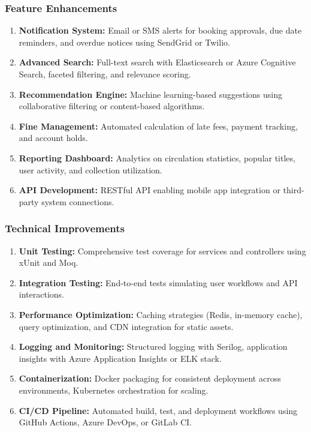 \documentclass[12pt,a4paper]{article}
\begin{document}
\subsubsection{Feature Enhancements}

\begin{enumerate}[leftmargin=*]
    \item \textbf{Notification System:} Email or SMS alerts for booking approvals, due date reminders, and overdue notices using SendGrid or Twilio.
    
    \item \textbf{Advanced Search:} Full-text search with Elasticsearch or Azure Cognitive Search, faceted filtering, and relevance scoring.
    
    \item \textbf{Recommendation Engine:} Machine learning-based suggestions using collaborative filtering or content-based algorithms.
    
    \item \textbf{Fine Management:} Automated calculation of late fees, payment tracking, and account holds.
    
    \item \textbf{Reporting Dashboard:} Analytics on circulation statistics, popular titles, user activity, and collection utilization.
    
    \item \textbf{API Development:} RESTful API enabling mobile app integration or third-party system connections.
\end{enumerate}

\subsubsection{Technical Improvements}

\begin{enumerate}[leftmargin=*]
    \item \textbf{Unit Testing:} Comprehensive test coverage for services and controllers using xUnit and Moq.
    
    \item \textbf{Integration Testing:} End-to-end tests simulating user workflows and API interactions.
    
    \item \textbf{Performance Optimization:} Caching strategies (Redis, in-memory cache), query optimization, and CDN integration for static assets.
    
    \item \textbf{Logging and Monitoring:} Structured logging with Serilog, application insights with Azure Application Insights or ELK stack.
    
    \item \textbf{Containerization:} Docker packaging for consistent deployment across environments, Kubernetes orchestration for scaling.
    
    \item \textbf{CI/CD Pipeline:} Automated build, test, and deployment workflows using GitHub Actions, Azure DevOps, or GitLab CI.
\end{enumerate}
\end{document}

